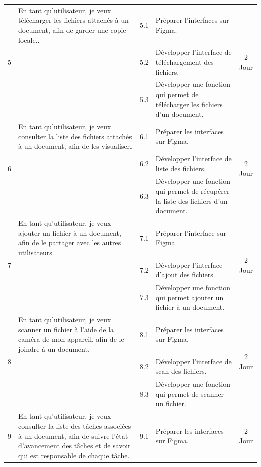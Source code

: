 \begin{adjustwidth}{-1cm}{}
\begin{longtable}{|c|p{6cm}|c|p{6cm}|c|}
      \cline{1-5}
      \multirow{3}{*}{5} & En tant qu'utilisateur, je veux télécharger les fichiers attachés à un document, afin de garder une copie locale.. & 5.1 & Préparer l'interfaces sur Figma. & \multirow{3}{*}{2 Jour} \\
      \cline{3-4}
      & & 5.2 & Développer l'interface de téléchargement des fichiers. & \\
      \cline{3-4}
      & & 5.3 & Développer une fonction qui permet de télécharger les fichiers d'un document. & \\
      \cline{1-5}
      \multirow{3}{*}{6} & En tant qu'utilisateur, je veux consulter la liste des fichiers attachés à un document, afin de les visualiser. & 6.1 & Préparer les interfaces sur Figma. & \multirow{3}{*}{2 Jour} \\
      \cline{3-4}
      & & 6.2 & Développer l'interface de liste des fichiers. & \\
      \cline{3-4}
      & & 6.3 & Développer une fonction qui permet de récupérer la liste des fichiers d'un document. & \\
      \cline{1-5}
      \multirow{3}{*}{7} & En tant qu'utilisateur, je veux ajouter un fichier à un document, afin de le partager avec les autres utilisateurs. & 7.1 & Préparer l'interface sur Figma. & \multirow{3}{*}{2 Jour} \\
      \cline{3-4}
      & & 7.2 & Développer l'interface d'ajout des fichiers. & \\
      \cline{3-4}
      & & 7.3 & Développer une fonction qui permet ajouter un fichier à un document. & \\
      \cline{1-5}
      \multirow{3}{*}{8} & En tant qu'utilisateur, je veux scanner un fichier à l'aide de la caméra de mon appareil, afin de le joindre à un document. & 8.1 & Préparer les interfaces sur Figma. & \multirow{3}{*}{2 Jour} \\
      \cline{3-4}
      & & 8.2 & Développer l'interface de scan des fichiers. & \\
      \cline{3-4}
      & & 8.3 & Développer une fonction qui permet de scanner un fichier. & \\
      \cline{1-5}
      \multirow{3}{*}{9} & En tant qu'utilisateur, je veux consulter la liste des tâches associées à un document, afin de suivre l'état d'avancement des tâches et de savoir qui est responsable de chaque tâche. & 9.1 & Préparer les interfaces sur Figma. & \multirow{3}{*}{2 Jour} \\

\end{longtable}
\end{adjustwidth}
